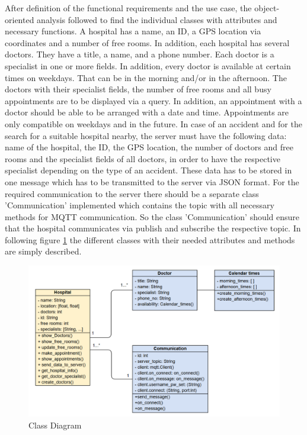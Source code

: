 After definition of the functional requirements and the use case, the object-oriented analysis followed to find the individual classes with attributes and necessary functions. 
A hospital has a name, an ID, a GPS location via coordinates and a number of free rooms. In addition, each hospital has several doctors. They have a title, a name, and a phone number. Each doctor is a specialist in one or more fields. In addition, every doctor is available at certain times on weekdays. That can be in the morning and/or in the afternoon. The doctors with their specialist fields, the number of free rooms and all busy appointments are to be displayed via a query. In addition, an appointment with a doctor should be able to be arranged with a date and time. Appointments are only compatible on weekdays and in the future. In case of an accident and for the search for a suitable hospital nearby, the server must have the following data: name of the hospital, the ID, the GPS location, the number of doctors and free rooms and the specialist fields of all doctors, in order to have the respective specialist depending on the type of an accident. These data has to be stored in one message which has to be transmitted to the server via JSON format. 
For the required communication to the server there should be a separate class 'Communication' implemented which contains the topic with all necessary methods for MQTT communication. So the class 'Communication' should ensure that the hospital communicates via publish and subscribe the respective topic. 
In following figure \ref{Class_diagram} the different classes with their needed attributes and methods are simply described.

\begin{figure}[H]
\centering
\sidecaption
\includegraphics[scale=.425]{images/melanie_images/Class_model.png}
\caption{Class Diagram}
\label{Class_diagram}
\end{figure}

